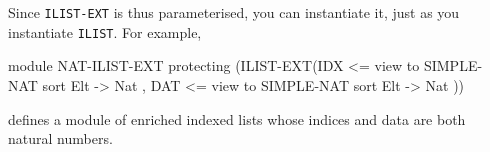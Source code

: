 \documentclass[a4paper]{memoir}
\begin{document}

Since \verb|ILIST-EXT| is thus parameterised, you can instantiate it,
just as you instantiate \verb|ILIST|. For example,
\begin{vvtm}
\begin{ccode}
  module NAT-ILIST-EXT {
    protecting (ILIST-EXT(IDX <= view to SIMPLE-NAT { sort Elt -> Nat },
                          DAT <= view to SIMPLE-NAT { sort Elt -> Nat }))
  }
\end{ccode}
\end{vvtm}
defines a module of enriched indexed lists whose indices and data are
both natural numbers.
\end{document}

